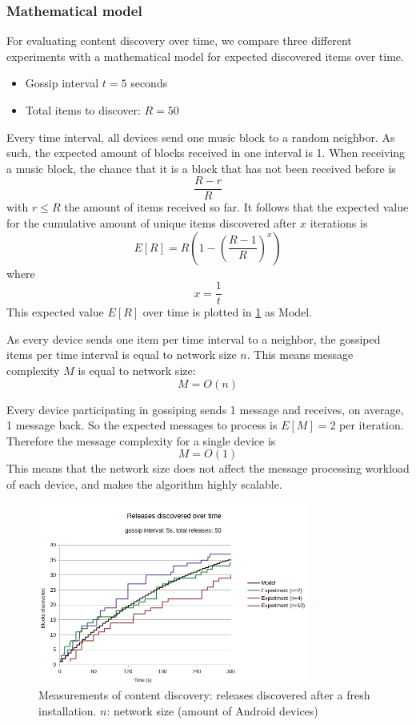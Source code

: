 \subsubsection{\textbf{Mathematical model}}
For evaluating content discovery over time, we compare three different experiments with a mathematical model for expected discovered items over time.

\begin{itemize}
    \item Gossip interval $t=5$ seconds
    \item Total items to discover: $R=50$
\end{itemize}

Every time interval, all devices send one music block to a random neighbor. As such, the expected amount of blocks received in one interval is 1. When receiving a music block, the chance that it is a block that has not been received before is $$\frac{R-r}{R}$$ with $r\leq R$ the amount of items received so far. It follows that the expected value for the cumulative amount of unique items discovered after $x$ iterations is $$E[R]=R(1-(\frac{R-1}{R})^{x})$$ where $$x=\frac{1}{t}$$ This expected value $E[R]$ over time is plotted in \ref{fig:content-discovery} as Model.

As every device sends one item per time interval to a neighbor, the gossiped items per time interval is equal to network size $n$. This means message complexity $M$ is equal to network size: $$M=O(n)$$

Every device participating in gossiping sends 1 message and receives, on average, 1 message back. So the expected messages to process is $E[M]=2$ per iteration. Therefore the message complexity for a single device is $$M=O(1)$$ This means that the network size does not affect the message processing workload of each device, and makes the algorithm highly scalable.

\begin{figure}
    \centering
    \includegraphics[width=0.8\textwidth]{evaluation/expected-vs-simulated-releases-2.png}
    \caption{Measurements of content discovery: releases discovered after a fresh installation. $n$: network size (amount of Android devices)}
    \label{fig:content-discovery}
\end{figure}

